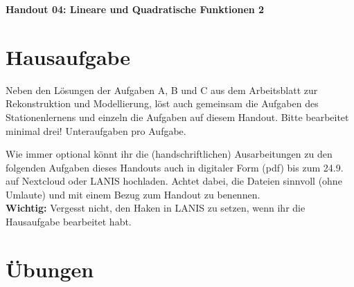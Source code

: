 \documentclass[a4paper,12pt]{exam}
\begin{document}
\vspace*{0.3cm}
\begin{center}
	\huge\bfseries Handout 04: Lineare und Quadratische Funktionen 2
\end{center}

\section*{Hausaufgabe}

\par Neben den Lösungen der Aufgaben A, B und C aus dem Arbeitsblatt zur Rekonstruktion und Modellierung, löst auch gemeinsam die Aufgaben des Stationenlernens und einzeln die Aufgaben auf diesem Handout. Bitte bearbeitet minimal drei! Unteraufgaben pro Aufgabe.

\par Wie immer optional könnt ihr die (handschriftlichen) Ausarbeitungen zu den folgenden Aufgaben dieses Handouts auch in digitaler Form (pdf) bis zum 24.9. auf Nextcloud oder LANIS hochladen. Achtet dabei, die Dateien sinnvoll (ohne Umlaute) und mit einem Bezug zum Handout zu benennen.\\ \textbf{Wichtig:} Vergesst nicht, den Haken in LANIS zu setzen, wenn ihr die Hausaufgabe bearbeitet habt.

\section*{Übungen}
\end{document}
